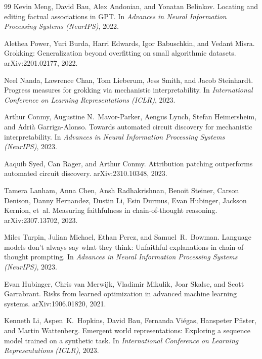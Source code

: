\documentclass{article}
\begin{document}
\begin{thebibliography}{99}
Kevin Meng, David Bau, Alex Andonian, and Yonatan Belinkov.
\newblock Locating and editing factual associations in {GPT}.
\newblock In \emph{Advances in Neural Information Processing Systems (NeurIPS)}, 2022.

Alethea Power, Yuri Burda, Harri Edwards, Igor Babuschkin, and Vedant Misra.
\newblock Grokking: Generalization beyond overfitting on small algorithmic
  datasets.
\newblock arXiv:2201.02177, 2022.

Neel Nanda, Lawrence Chan, Tom Lieberum, Jess Smith, and Jacob Steinhardt.
\newblock Progress measures for grokking via mechanistic interpretability.
\newblock In \emph{International Conference on Learning Representations (ICLR)}, 2023.

Arthur Conmy, Augustine N.\ Mavor-Parker, Aengus Lynch, Stefan Heimersheim,
  and Adri\`{a} Garriga-Alonso.
\newblock Towards automated circuit discovery for mechanistic interpretability.
\newblock In \emph{Advances in Neural Information Processing Systems (NeurIPS)}, 2023.

Aaquib Syed, Can Rager, and Arthur Conmy.
\newblock Attribution patching outperforms automated circuit discovery.
\newblock arXiv:2310.10348, 2023.

Tamera Lanham, Anna Chen, Ansh Radhakrishnan, Benoit Steiner, Carson Denison,
  Danny Hernandez, Dustin Li, Esin Durmus, Evan Hubinger, Jackson Kernion,
  et~al.
\newblock Measuring faithfulness in chain-of-thought reasoning.
\newblock arXiv:2307.13702, 2023.

Miles Turpin, Julian Michael, Ethan Perez, and Samuel~R.\ Bowman.
\newblock Language models don't always say what they think: Unfaithful
  explanations in chain-of-thought prompting.
\newblock In \emph{Advances in Neural Information Processing Systems (NeurIPS)}, 2023.

Evan Hubinger, Chris van Merwijk, Vladimir Mikulik, Joar Skalse, and
  Scott Garrabrant.
\newblock Risks from learned optimization in advanced machine learning systems.
\newblock arXiv:1906.01820, 2021.

Kenneth Li, Aspen~K.\ Hopkins, David Bau, Fernanda Vi\'{e}gas, Hanspeter
  Pfister, and Martin Wattenberg.
\newblock Emergent world representations: Exploring a sequence model trained on
  a synthetic task.
\newblock In \emph{International Conference on Learning Representations (ICLR)}, 2023.


\end{thebibliography}
\end{document}
